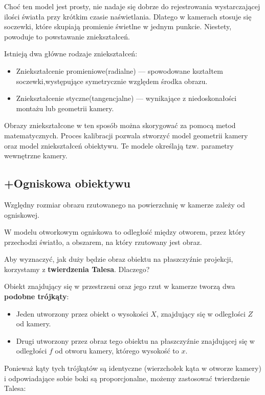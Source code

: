 \documentclass[magisterska]{pracadypl}
\begin{document}
Choć ten model jest prosty, nie nadaje się dobrze do rejestrowania wystarczającej ilości światła przy krótkim czasie naświetlania. Dlatego w kamerach stosuje się soczewki, które skupiają promienie świetlne w jednym punkcie. Niestety, powoduje to powstawanie zniekształceń.

Istnieją dwa główne rodzaje zniekształceń:

\begin{itemize}
  \item Zniekształcenie promieniowe(radialne) — spowodowane kształtem soczewki,występujące symetrycznie względem środka obrazu.

  \item Zniekształcenie styczne(tangencjalne) — wynikające z niedoskonałości montażu lub geometrii kamery.
\end{itemize}

Obrazy zniekształcone w ten sposób można skorygować za pomocą metod matematycznych. Proces kalibracji pozwala stworzyć model geometrii kamery oraz model zniekształceń obiektywu. Te modele określają tzw. parametry wewnętrzne kamery.

\subsection{+Ogniskowa obiektywu}

Względny rozmiar obrazu rzutowanego na powierzchnię w kamerze zależy od ogniskowej.

W modelu otworkowym ogniskowa to odległość między otworem, przez który przechodzi światło, a obszarem, na który rzutowany jest obraz.

Aby wyznaczyć, jak duży będzie obraz obiektu na płaszczyźnie projekcji, korzystamy z \textbf{twierdzenia Talesa}.  
Dlaczego?

Obiekt znajdujący się w przestrzeni oraz jego rzut w kamerze tworzą dwa \textbf{podobne trójkąty}:
\begin{itemize}
    \item Jeden utworzony przez obiekt o wysokości \( X \), znajdujący się w odległości \( Z \) od kamery.
    \item Drugi utworzony przez obraz tego obiektu na płaszczyźnie znajdującej się w odległości \( f \) od otworu kamery, którego wysokość to \( x \).
\end{itemize}

Ponieważ kąty tych trójkątów są identyczne (wierzchołek kąta w otworze kamery) i odpowiadające sobie boki są proporcjonalne, możemy zastosować twierdzenie Talesa:
\end{document}
